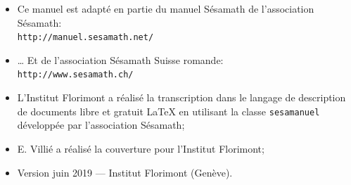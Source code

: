 \documentclass[TS]{sesamanuel}
\begin{document}
\vfill


\newpage


\begin{prerequis}
\begin{itemize}
\item  Ce manuel est adapté en partie du manuel Sésamath de l'association Sésamath:\\
\texttt{http://manuel.sesamath.net/}
\item … Et de l'association Sésamath Suisse romande:\\ \texttt{http://www.sesamath.ch/}
\item L'Institut Florimont a réalisé la transcription dans le langage de description de documents libre et gratuit \LaTeX{} en utilisant la classe \texttt{sesamanuel} développée par l'association Sésamath;
\item E. Villié a réalisé la couverture pour l'Institut Florimont;
\item Version juin 2019 --- Institut Florimont (Genève).
\end{itemize}
 \end{prerequis}

\vspace{10em}





\setcounter{chapter}{0}

\setcounter{page}{6}

\themaC


\themaG


\themaC


\themaC


\themaG


\themaC


\themaG


\themaC


\themaC


\end{document}
